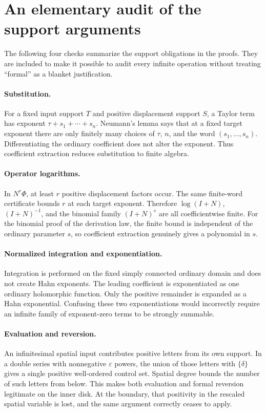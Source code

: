 \documentclass[11pt,a4paper]{article}
\numberwithin{equation}{section}
\theoremstyle{definition}
\theoremstyle{remark}
\newcommand{\eps}{\varepsilon}
\begin{document}
\appendix
\section{An elementary audit of the support arguments}
\label{app:support}

The following four checks summarize the support obligations in the proofs.
They are included to make it possible to audit every infinite operation
without treating ``formal'' as a blanket justification.

\paragraph{Substitution.}
For a fixed input support $T$ and positive displacement support $S$, a
Taylor term has exponent $\tau+s_1+\cdots+s_n$.  Neumann's lemma says that
at a fixed target exponent there are only finitely many choices of
$\tau$, $n$, and the word $(s_1,\ldots,s_n)$.  Differentiating the ordinary
coefficient does not alter the exponent.  Thus coefficient extraction
reduces substitution to finite algebra.

\paragraph{Operator logarithms.}
In $N^r\Phi$, at least $r$ positive displacement factors occur.  The same
finite-word certificate bounds $r$ at each target exponent.  Therefore
$\log(I+N)$, $(I+N)^{-1}$, and the binomial family $(I+N)^s$ are all
coefficientwise finite.  For the binomial proof of the derivation law, the
finite bound is independent of the ordinary parameter $s$, so coefficient
extraction genuinely gives a polynomial in $s$.

\paragraph{Normalized integration and exponentiation.}
Integration is performed on the fixed simply connected ordinary domain and
does not create Hahn exponents.  The leading coefficient is exponentiated
as one ordinary holomorphic function.  Only the positive remainder is
expanded as a Hahn exponential.  Confusing these two exponentiations would
incorrectly require an infinite family of exponent-zero terms to be
strongly summable.

\paragraph{Evaluation and reversion.}
An infinitesimal spatial input contributes positive letters from its own
support.  In a double series with nonnegative $\eps$ powers, the union of
those letters with $\{\delta\}$ gives a single positive well-ordered
control set.  Spatial degree bounds the number of such letters from below.
This makes both evaluation and formal reversion legitimate on the inner
disk.  At the boundary, that positivity in the rescaled spatial variable
is lost, and the same argument correctly ceases to apply.
\end{document}

